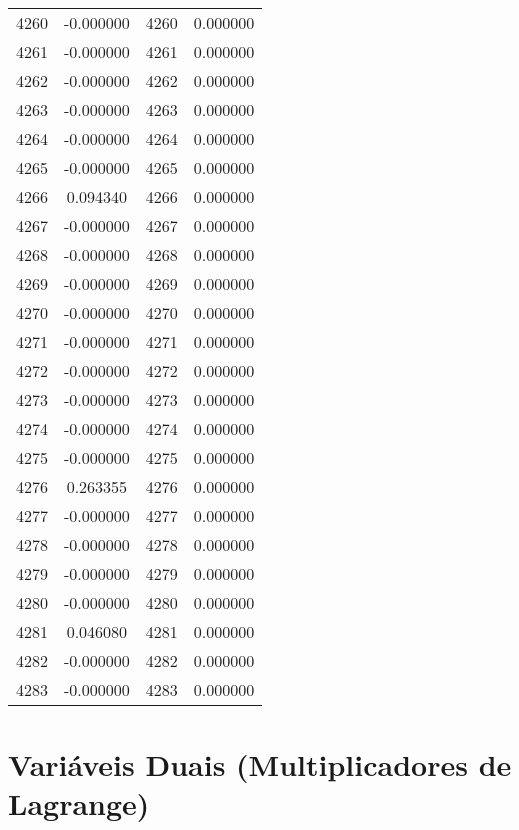 \documentclass[12pt]{article}
\begin{document}
\begin{longtable}{@{}cccc@{}}
4260 & -0.000000 & 4260 & 0.000000 \\
4261 & -0.000000 & 4261 & 0.000000 \\
4262 & -0.000000 & 4262 & 0.000000 \\
4263 & -0.000000 & 4263 & 0.000000 \\
4264 & -0.000000 & 4264 & 0.000000 \\
4265 & -0.000000 & 4265 & 0.000000 \\
4266 & 0.094340 & 4266 & 0.000000 \\
4267 & -0.000000 & 4267 & 0.000000 \\
4268 & -0.000000 & 4268 & 0.000000 \\
4269 & -0.000000 & 4269 & 0.000000 \\
4270 & -0.000000 & 4270 & 0.000000 \\
4271 & -0.000000 & 4271 & 0.000000 \\
4272 & -0.000000 & 4272 & 0.000000 \\
4273 & -0.000000 & 4273 & 0.000000 \\
4274 & -0.000000 & 4274 & 0.000000 \\
4275 & -0.000000 & 4275 & 0.000000 \\
4276 & 0.263355 & 4276 & 0.000000 \\
4277 & -0.000000 & 4277 & 0.000000 \\
4278 & -0.000000 & 4278 & 0.000000 \\
4279 & -0.000000 & 4279 & 0.000000 \\
4280 & -0.000000 & 4280 & 0.000000 \\
4281 & 0.046080 & 4281 & 0.000000 \\
4282 & -0.000000 & 4282 & 0.000000 \\
4283 & -0.000000 & 4283 & 0.000000 \\

\end{longtable}

\section{Variáveis Duais (Multiplicadores de Lagrange)}
\end{document}
